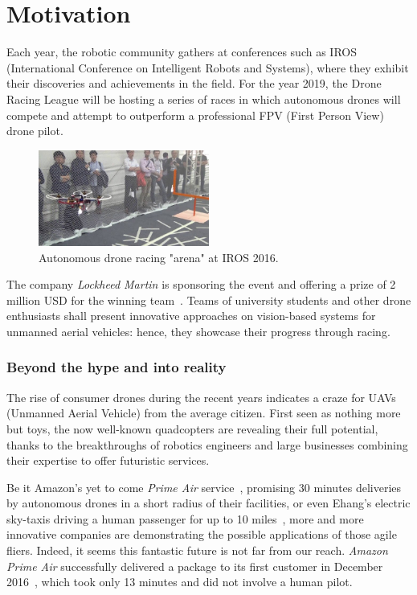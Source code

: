 \section{Motivation}


Each year, the robotic community gathers at conferences such as IROS
(International Conference on Intelligent Robots and Systems), where they
exhibit their discoveries and achievements in the field. For the year 2019, the
Drone Racing League will be hosting a series of races in which autonomous drones
will compete and attempt to outperform a professional FPV (First Person View)
drone pilot.\\

\begin{figure}[h]
	\centering
	\includegraphics[width=0.5\textwidth]{figure/iros_2016.jpg}
	\caption{Autonomous drone racing "arena" at IROS 2016.}
	\label{fig:iros}
\end{figure}

The company \emph{Lockheed Martin} is sponsoring the event and offering a prize of 2
million USD for the winning team~\cite{LockheedDRL}. Teams of university
students and other drone enthusiasts shall present innovative approaches on
vision-based systems for unmanned aerial vehicles: hence, they showcase their
progress through racing.\\

\subsubsection{Beyond the hype and into reality}
The rise of consumer drones during the recent years indicates a craze for UAVs
(Unmanned Aerial Vehicle) from the average citizen. First seen as nothing more
but toys, the now well-known quadcopters are revealing their full potential,
thanks to the breakthroughs of robotics engineers and large businesses combining
their expertise to offer futuristic services.

Be it Amazon's yet to come \emph{Prime Air} service~\cite{PrimeAir}, promising
30 minutes deliveries by autonomous drones in a short radius of their
facilities, or even Ehang's electric sky-taxis driving a human passenger for up
to 10 miles~\cite{Ehang184}, more and more innovative companies are
demonstrating the possible applications of those agile fliers.  Indeed, it seems
this fantastic future is not far from our reach. \emph{Amazon Prime Air}
successfully delivered a package to its first customer in December
2016~\cite{PrimeAirFirst}, which took only 13 minutes and did not involve a
human pilot.\\

